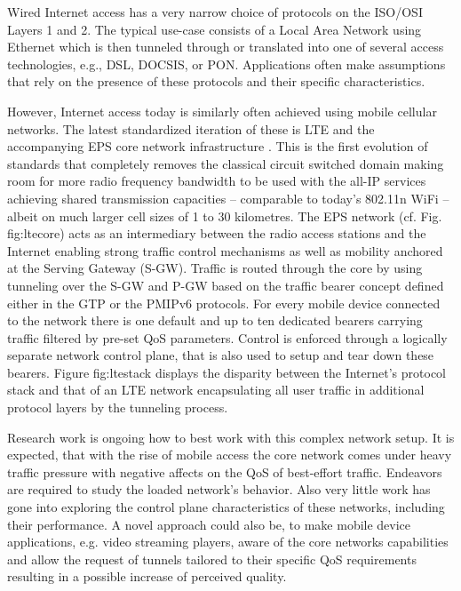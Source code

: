 Wired Internet access has a very narrow choice of protocols on the ISO/OSI Layers 1 and 2. The typical use-case consists of a Local Area Network using Ethernet which is then tunneled through or translated into one of several access technologies, e.g., DSL, DOCSIS, or PON. Applications often make assumptions that rely on the presence of these protocols and their specific characteristics.

However, Internet access today is similarly often achieved using mobile cellular networks. The latest standardized iteration of these is LTE and the accompanying EPS core network infrastructure \cite{olsson2009sae}. This is the first evolution of standards that completely removes the classical circuit switched domain making room for more radio frequency bandwidth to be used with the all-IP services achieving shared transmission capacities -- comparable to today's 802.11n WiFi -- albeit on much larger cell sizes of 1 to 30 kilometres. The EPS network (cf. Fig. fig:ltecore) acts as an intermediary between the radio access stations and the Internet enabling strong traffic control mechanisms as well as mobility anchored at the Serving Gateway (S-GW). Traffic is routed through the core by using tunneling over the S-GW and P-GW based on the traffic bearer concept defined either in the GTP or the PMIPv6 protocols. For every mobile device connected to the network there is one default and up to ten dedicated bearers carrying traffic filtered by pre-set QoS parameters. Control is enforced through a logically separate network control plane, that is also used to setup and tear down these bearers. Figure fig:ltestack displays the disparity between the Internet's protocol stack and that of an LTE network encapsulating all user traffic in additional protocol layers by the tunneling process.

Research work is ongoing how to best work with this complex network setup. It is expected, that with the rise of mobile access the core network comes under heavy traffic pressure with negative affects on the QoS of best-effort traffic. Endeavors are required to study the loaded network's behavior. Also very little work has gone into exploring the control plane characteristics of these networks, including their performance. A novel approach could also be, to make mobile device applications, e.g. video streaming players, aware of the core networks capabilities and allow the request of tunnels tailored to their specific QoS requirements resulting in a possible increase of perceived quality.

